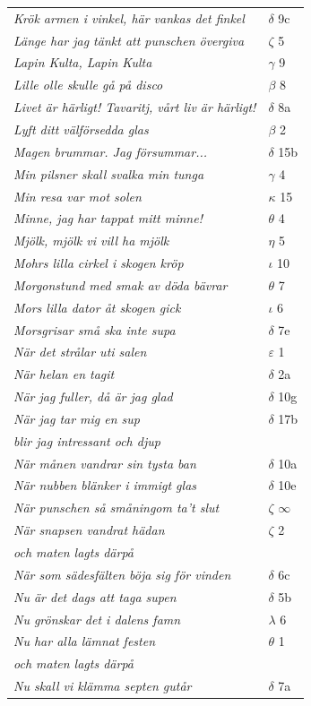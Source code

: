 \documentclass[a6paper,10pt]{article}
\begin{document}
\newpage
\begin{table}[!h]
\begin{tabular}{l l}
\textit{Krök armen i vinkel, här vankas det finkel}	&$\delta$ 9c\\
\textit{Länge har jag tänkt att punschen övergiva}	&$\zeta$ 5\\
\textit{Lapin Kulta, Lapin Kulta}	&$\gamma$ 9\\
\textit{Lille olle skulle gå på disco}	&$\beta$ 8\\
\textit{Livet är härligt! Tavaritj, vårt liv är härligt!}	&$\delta$ 8a\\
\textit{Lyft ditt välförsedda glas}	&$\beta$ 2\\
\textit{Magen brummar. Jag försummar...}	&$\delta$ 15b\\
\textit{Min pilsner skall svalka min tunga}	&$\gamma$ 4\\
\textit{Min resa var mot solen} &$\kappa$ 15\\
\textit{Minne, jag har tappat mitt minne!}	&$\theta$ 4\\
\textit{Mjölk, mjölk vi vill ha mjölk}	&$\eta$ 5\\
\textit{Mohrs lilla cirkel i skogen kröp}	&$\iota$ 10\\
\textit{Morgonstund med smak av döda bävrar}	&$\theta$ 7\\
\textit{Mors lilla dator åt skogen gick}	&$\iota$ 6\\
\textit{Morsgrisar små ska inte supa}	&$\delta$ 7e\\
\textit{När det strålar uti salen}	&$\varepsilon$ 1\\
\textit{När helan en tagit}	&$\delta$ 2a\\
\textit{När jag fuller, då är jag glad}	&$\delta$ 10g\\
\textit{När jag tar mig en sup}	&$\delta$ 17b\\
\textit{blir jag intressant och djup} &\\
\textit{När månen vandrar sin tysta ban}	&$\delta$ 10a\\
\textit{När nubben blänker i immigt glas}	&$\delta$ 10e\\
\textit{När punschen så småningom ta't slut}	&$\zeta$ $\infty$\\
\textit{När snapsen vandrat hädan}	&$\zeta$ 2\\
\textit{och maten lagts därpå} &\\
\textit{När som sädesfälten böja sig för vinden}	&$\delta$ 6c\\
\textit{Nu är det dags att taga supen}	&$\delta$ 5b\\
\textit{Nu grönskar det i dalens famn}	&$\lambda$ 6\\
\textit{Nu har alla lämnat festen}	&$\theta$ 1\\
\textit{och maten lagts därpå} &\\
\textit{Nu skall vi klämma septen gutår}	&$\delta$ 7a\\
\end{tabular}
\end{table}
\end{document}
